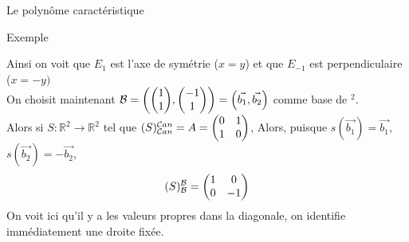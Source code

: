 \begin{parag}{Le polynôme caractéristique}
\begin{subparag}{Exemple}
\begin{itemize}
        \end{itemize}
        Ainsi on voit que $E_1$ est l'axe de symétrie ($x =y$) et que $E_{-1}$ est perpendiculaire ($x = -y)$
        \\
        On choisit maintenant $\bmath = \left(\begin{pmatrix}
            1 \\ 1
        \end{pmatrix}, \begin{pmatrix}
            -1 \\ 1
        \end{pmatrix}\right) = \left(\vec{b_1}, \vec{b_2}\right)$ comme base de \R$^2$.
        \\
        Alors si $S : \mathbb{R}^2 \to \mathbb{R}^2 $ tel que $(S)_{\mathcal{C} an}^{\mathcal{C} an} = A = \begin{pmatrix}
            0 & 1 \\ 1 & 0
        \end{pmatrix}$, Alors, puisque $s(\vec{b_1})= \vec{b_1}$, $s(\vec{b_2}) = -\vec{b_2}$,
        \[(S)_{\mathcal{B}}^{\mathcal{B}} = \begin{pmatrix}
            1 & 0 \\ 0 & -1
        \end{pmatrix}\]
        On voit ici qu'il y a les valeurs propres dans la diagonale, on identifie immédiatement une droite fixée.
    \end{subparag}
    
\end{parag}


